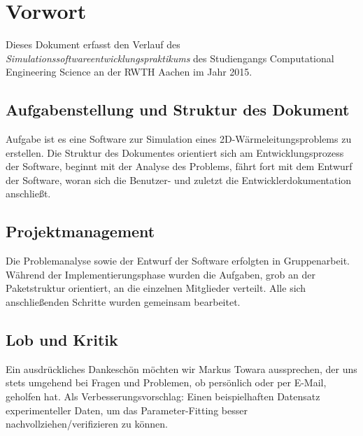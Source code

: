 \chapter{Vorwort}

Dieses Dokument erfasst den Verlauf des \emph{Simulationssoftwareentwicklungspraktikums} des Studiengangs Computational Engineering Science an der RWTH Aachen im Jahr 2015.

\section{Aufgabenstellung und Struktur des Dokument}

Aufgabe ist es eine Software zur Simulation eines 2D-Wärmeleitungsproblems zu erstellen. Die Struktur des Dokumentes orientiert sich am Entwicklungsprozess der Software, beginnt mit der Analyse des Problems, fährt fort mit dem Entwurf der Software, woran sich die Benutzer- und zuletzt die Entwicklerdokumentation anschließt.

\section{Projektmanagement}

Die Problemanalyse sowie der Entwurf der Software erfolgten in Gruppenarbeit. Während der Implementierungsphase wurden die Aufgaben, grob an der Paketstruktur orientiert, an die einzelnen Mitglieder verteilt. Alle sich anschließenden Schritte wurden gemeinsam bearbeitet.

\section{Lob und Kritik}

Ein ausdrückliches Dankeschön möchten wir Markus Towara aussprechen, der uns stets umgehend bei Fragen und Problemen, ob persönlich oder per E-Mail, geholfen hat.
Als Verbesserungsvorschlag: Einen beispielhaften Datensatz experimenteller Daten, um das Parameter-Fitting besser nachvollziehen/verifizieren zu können.